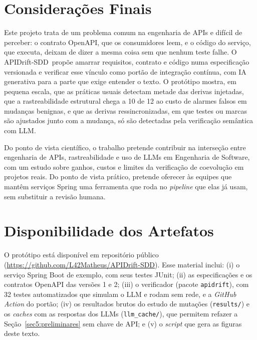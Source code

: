 \documentclass[12pt]{article}
\newcommand{\code}[1]{\texttt{#1}}
\newcommand{\proj}{APIDrift-SDD}
\newcommand{\repourl}{\url{https://github.com/L42Matheus/APIDrift-SDD}}
\begin{document}
\section{Considerações Finais}
\label{sec8:final}

Este projeto trata de um problema comum na engenharia de APIs e difícil de perceber: o contrato OpenAPI, que os consumidores leem, e o código do serviço, que executa, deixam de dizer a mesma coisa sem que nenhum teste falhe. O \proj\ propõe amarrar requisitos, contrato e código numa especificação versionada e verificar esse vínculo como portão de integração contínua, com IA generativa para a parte que exige entender o texto. O protótipo mostra, em pequena escala, que as práticas usuais detectam metade das derivas injetadas, que a rastreabilidade estrutural chega a 10 de 12 ao custo de alarmes falsos em mudanças benignas, e que as derivas ressincronizadas, em que testes ou marcas são ajustados junto com a mudança, só são detectadas pela verificação semântica com LLM.

Do ponto de vista científico, o trabalho pretende contribuir na interseção entre engenharia de APIs, rastreabilidade e uso de LLMs em Engenharia de Software, com um estudo sobre ganhos, custos e limites da verificação de coevolução em projetos reais. Do ponto de vista prático, pretende oferecer às equipes que mantêm serviços Spring uma ferramenta que roda no \textit{pipeline} que elas já usam, sem substituir a revisão humana.

\section*{Disponibilidade dos Artefatos}
{
\small
O protótipo está disponível em repositório público (\repourl). Esse material inclui: (i) o serviço Spring Boot de exemplo, com seus testes JUnit; (ii) as especificações e os contratos OpenAPI das versões 1 e 2; (iii) o verificador (pacote \code{apidrift}), com 32 testes automatizados que simulam o LLM e rodam sem rede, e a \textit{GitHub Action} do portão; (iv) os resultados brutos do estudo de mutações (\code{results/}) e os \textit{caches} com as respostas dos LLMs (\code{llm\_cache/}), que permitem refazer a Seção~\ref{sec5:preliminares} sem chave de API; e (v) o \textit{script} que gera as figuras deste texto.
}
\end{document}
